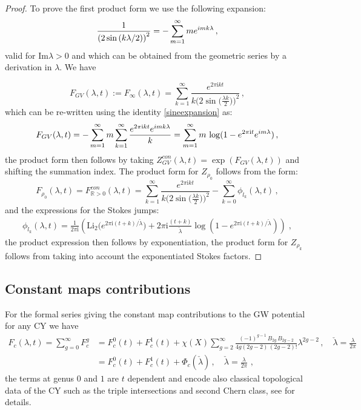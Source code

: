 \documentclass[a4paper,12pt,justification=centering]{article}
\numberwithin{equation}{section}
\newcommand{\ii}{\textnormal{i}}
\newcommand{\I}{{\mathrm i}}
\newcommand{\la}{{\lambda}}
\theoremstyle{plain}%
\theoremstyle{definition}
\begin{document}
\begin{proof}
To prove the first product form we use the following expansion:
\begin{equation}\label{sineexpansion}
\frac{1}{\left(2\sin\left(k\lambda/2\right)\right)^2}= -\sum_{m=1}^{\infty} m e^{\ii m k \lambda}\,,
\end{equation}
valid for $\textrm{Im}\lambda >0 $ and which can be obtained from the geometric series by a derivation in $\lambda$. We have 

\begin{equation}
F_{GV}(\lambda,t):=F_{\infty}(\lambda,t)= \sum_{k=1}^\infty\frac{e^{2\pi \I k t}}{k\big(2\sin\big(\frac{\lambda k}{2}\big)\big)^2}\,,
\end{equation}
which can be re-written using the identity \eqref{sineexpansion} as:
\begin{equation}
F_{GV}(\lambda,t)= - \sum_{m=1}^{\infty} m \sum_{k=1}^\infty\frac{e^{2\pi \I k t} e^{\ii m k \lambda}}{k} =  \sum_{m=1}^{\infty} m \,\log(1-e^{2\pi \I  t} e^{\ii m  \lambda}) \,,
\end{equation}
the product form then follows by taking $Z^{con}_{GV}(\lambda,t)=\exp(F_{GV}(\lambda,t))$ and shifting the summation index.
The product form for $Z_{\rho_0}$ follows from the form:
\begin{equation}
F_{\rho_0}(\la,t)= F^{con}_{\mathbb{R}>0}(\lambda,t)= \sum_{k=1}^\infty\frac{e^{2\pi \I k t}}{k\big(2\sin\big(\frac{\lambda k}{2}\big)\big)^2}  -\sum_{k=0}^{\infty}\phi_{l_k}(\lambda,t)\,,
\end{equation}
and the expressions for the Stokes jumps:
\begin{align}
    \phi_{ l_k}(\lambda,t)=\frac{1}{2\pi \I} \left( \mathrm{Li}_2\big(e^{ 2\pi \I(t+k)/\check \lambda}\big) + 2\pi \I \frac{(t+k)}{\check \lambda} \log \left(1- e^{ 2\pi \I(t+k)/\check \lambda} \right)\right)\;,
\end{align}
the product expression then follows by exponentiation, the product form for $Z_{\rho_k}$ follows from taking into account the exponentiated Stokes factors.

\end{proof}


\subsection{Constant maps contributions}\label{sec:const}

For the formal series giving the constant map contributions to the GW potential for any CY we have
\begin{align}\label{formal}
F_{c}(\lambda,t) = \sum_{g=0}^{\infty} F^g_c &= F_c^0 (t) + F_c^1(t)+  \chi(X)  \sum_{g=2}^{\infty} \frac{ (-1)^{g-1}\, B_{2g}\, B_{2g-2}}{4g (2g-2)\, (2g-2)!} \lambda^{2g-2} \,, \quad \check{\lambda}=\frac{\lambda}{2\pi}\,\,\\
&= F_c^0 (t) + F_c^1(t)+ \Phi_c(\check{\lambda})\,, \quad \check{\lambda}=\frac{\lambda}{2\pi}\,\,,
\end{align} 
the terms at genus $0$ and $1$ are $t$ dependent and encode also classical topological data of the CY such as the triple intersections and second Chern class, see \cite{pandharipande2003three} for details.
\end{document}
